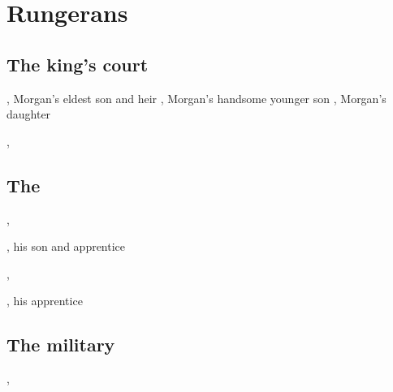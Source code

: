 \section{Rungerans}
\subsection{The king's court}
\begin{dramatispersonae}
  \begin{subdramatispersonae}
    \dramitem[Mathyas][Prince]  {\Mathyas}{\human}{\male}, 
      Morgan's eldest son and heir
    , 
      Morgan's handsome younger son
    \dramitem[Iselle] [Princess]{\Iselle}{\human}{\female}, 
      Morgan's daughter  
  \end{subdramatispersonae}
  , 
     \cleric{} 
\end{dramatispersonae}
\subsection[The Ishrah]{The }
\begin{dramatispersonae}
  , 
     \templar{} 
  \begin{subdramatispersonae}
    , 
      his son and apprentice
  \end{subdramatispersonae}
  \dramitem[Takestsha]{\Takestsha}{\human}{\female},
  \begin{subdramatispersonae}
    , his apprentice
  \end{subdramatispersonae}
\end{dramatispersonae}
\subsection{The military}
\begin{dramatispersonae}
  , 
     \cleric{} 
\end{dramatispersonae}
